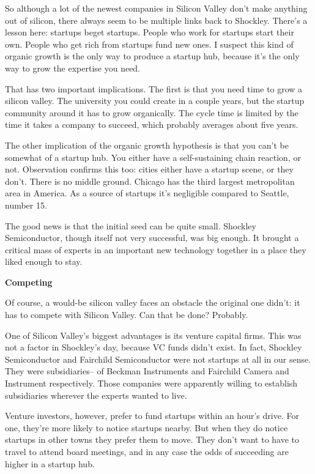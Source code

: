 So although a lot of the newest companies in Silicon Valley don't make
anything out of silicon, there always seem to be multiple links back to
Shockley. There's a lesson here: startups beget startups. People who
work for startups start their own. People who get rich from startups
fund new ones. I suspect this kind of organic growth is the only way to
produce a startup hub, because it's the only way to grow the expertise
you need.

That has two important implications. The first is that you need time to
grow a silicon valley. The university you could create in a couple
years, but the startup community around it has to grow organically. The
cycle time is limited by the time it takes a company to succeed, which
probably averages about five years.

The other implication of the organic growth hypothesis is that you can't
be somewhat of a startup hub. You either have a self-sustaining chain
reaction, or not. Observation confirms this too: cities either have a
startup scene, or they don't. There is no middle ground. Chicago has the
third largest metropolitan area in America. As a source of startups it's
negligible compared to Seattle, number 15.

The good news is that the initial seed can be quite small. Shockley
Semiconductor, though itself not very successful, was big enough. It
brought a critical mass of experts in an important new technology
together in a place they liked enough to stay.

\textbf{Competing}

Of course, a would-be silicon valley faces an obstacle the original one
didn't: it has to compete with Silicon Valley. Can that be done?
Probably.

One of Silicon Valley's biggest advantages is its venture capital firms.
This was not a factor in Shockley's day, because VC funds didn't exist.
In fact, Shockley Semiconductor and Fairchild Semiconductor were not
startups at all in our sense. They were subsidiaries-- of Beckman
Instruments and Fairchild Camera and Instrument respectively. Those
companies were apparently willing to establish subsidiaries wherever the
experts wanted to live.

Venture investors, however, prefer to fund startups within an hour's
drive. For one, they're more likely to notice startups nearby. But when
they do notice startups in other towns they prefer them to move. They
don't want to have to travel to attend board meetings, and in any case
the odds of succeeding are higher in a startup hub.

